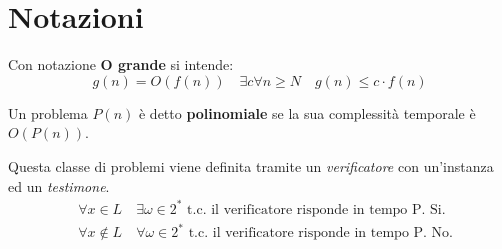 \documentclass[\main/main.tex]{subfiles}
\begin{document}
\chapter{Notazioni}
\begin{definition}[O grande]
  Con notazione \textbf{O grande} si intende:
  \[
    g(n) = O(f(n)) \quad \exists c \forall n \geq N \quad g(n) \leq c\cdot f(n)
  \]
\end{definition}

\begin{definition}
  Un problema \(P(n)\) è detto \textbf{polinomiale} se la sua complessità temporale è \(O(P(n))\).
\end{definition}

\begin{definition}
  Questa classe di problemi viene definita tramite un \textit{verificatore} con un'instanza ed un \textit{testimone}.
  \begin{align*}
     & \forall x \in L \quad \exists \omega \in 2^* \text{ t.c. il verificatore risponde in tempo P. Si.}     \\
     & \forall x \not\in L \quad \forall \omega \in 2^* \text{ t.c. il verificatore risponde in tempo P. No.}
  \end{align*}
\end{definition}
\end{document}
